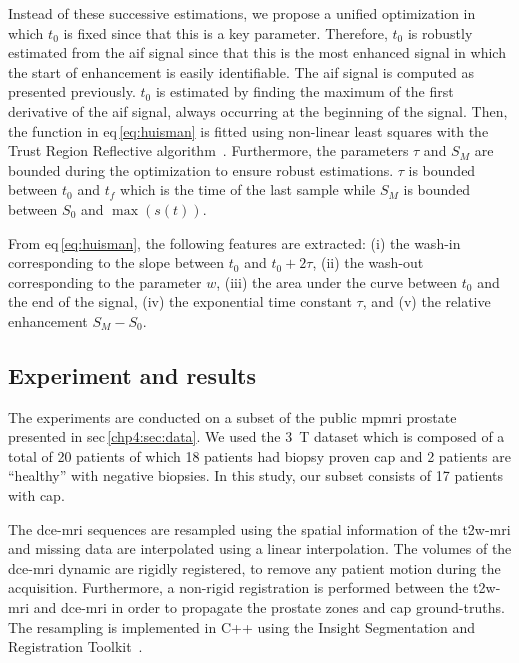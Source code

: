 Instead of these successive estimations, we propose a unified optimization in which $t_0$ is fixed since that this is a key parameter.
Therefore, $t_0$ is robustly estimated from the \ac{aif} signal since that this is the most enhanced signal in which the start of enhancement is easily identifiable.
The \ac{aif} signal is computed as presented previously.
$t_0$ is estimated by finding the maximum of the first derivative of the \ac{aif} signal, always occurring at the beginning of the signal.
Then, the function in \acs{eq}\,\eqref{eq:huisman} is fitted using non-linear least squares with the Trust Region Reflective algorithm~\cite{sorensen1982newton}.
Furthermore, the parameters $\tau$ and $S_M$ are bounded during the optimization to ensure robust estimations.
$\tau$ is bounded between $t_0$ and $t_f$ which is the time of the last sample while $S_M$ is bounded between $S_0$ and $\max(s(t))$.


From \acs{eq}\,\eqref{eq:huisman}, the following features are extracted:
(i) the wash-in corresponding to the slope between $t_0$ and $t_0 + 2 \tau$,
(ii) the wash-out corresponding to the parameter $w$,
(iii) the area under the curve between $t_0$ and the end of the signal,
(iv) the exponential time constant $\tau$, and
(v) the relative enhancement $S_M - S_0$.


\subsection{Experiment and results}\label{subsec:chp5:DCE-norm:exp-res}


The experiments are conducted on a subset of the public \ac{mpmri} prostate presented in \acs{sec}\,\ref{chp4:sec:data}.
We used the \SI{3}{\tesla} dataset which is composed of a total of 20 patients of which 18 patients had biopsy proven \ac{cap} and 2 patients are ``healthy'' with negative biopsies. 
In this study, our subset consists of 17 patients with \ac{cap}.

The \ac{dce}-\ac{mri} sequences are resampled using the spatial information of the \ac{t2w}-\ac{mri} and missing data are interpolated using a linear interpolation.
The volumes of the \ac{dce}-\ac{mri} dynamic are rigidly registered, to remove any patient motion during the acquisition.
Furthermore, a non-rigid registration is performed between the \ac{t2w}-\ac{mri} and \ac{dce}-\ac{mri} in order to propagate the prostate zones and \ac{cap} ground-truths.
The resampling is implemented in C++ using the Insight Segmentation and Registration Toolkit~\cite{ibanez2005itk}.

